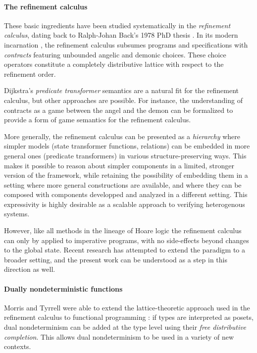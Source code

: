 \documentclass[format=sigplan,authordraft]{acmart}
\begin{document}
\paragraph{The refinement calculus} %

These basic ingredients have been studied systematically
in the \emph{refinement calculus},
dating back to Ralph-Johan Back's 1978 PhD thesis \cite{backthesis}.
In its modern incarnation \cite{refcal},
the refinement calculus
subsumes programs and specifications with \emph{contracts}
featuring unbounded angelic and demonic choices.
These choice operators
constitute a completely distributive lattice
with respect to the refinement order.

Dijkstra's \emph{predicate transformer} semantics \cite{gc}
are a natural fit for the refinement calculus,
but other approaches are possible.
For instance,
the understanding of contracts as a game between
the angel and the demon
can be formalized to provide a form of
game semantics for the refinement calculus.

More generally,
the refinement calculus can be presented as a \emph{hierarchy}
where simpler models (state transformer functions, relations)
can be embedded in more general ones (predicate transformers)
in various structure-preserving ways.
This makes it possible to reason about simpler components
in a limited, stronger version of the framework,
while retaining the possibility of embedding them
in a setting
where more general constructions are available,
and where they can be composed with components
developped and analyzed in a different setting.
This expressivity is highly desirable
as a scalable approach to
verifying heterogenous systems.

However,
like all methods in the lineage of Hoare logic
the refinement calculus can only by applied to imperative programs,
with no side-effects beyond changes to the global state.
Recent research has attempted to extend the paradigm
to a broader setting,
and the present work can be understood
as a step in this direction as well.


\paragraph{Dually nondeterministic functions} %

Morris and Tyrrell were able to extend
the lattice-theoretic approach used in the refinement calculus
to functional programming
\cite{augtyp,dndf,cspdnd}:
if types are interpreted as posets,
dual nondeterminism can be added at the type level
using their \emph{free distributive completion}.
This allows dual nondeterminism to be used
in a variety of new contexts.
\end{document}
